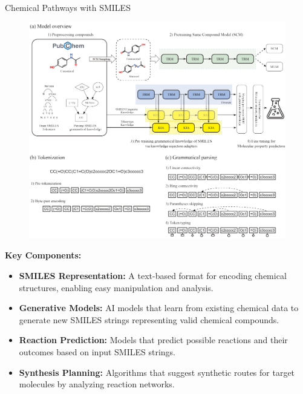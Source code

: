 \begin{frame}[allowframebreaks]{Chemical Pathways with SMILES}
    \framebreak

    \begin{figure}
        \centering
        \includegraphics[height=0.9\textheight,width=1\textwidth,keepaspectratio]{images/science/smile-architecture.png}
    \end{figure}

    \framebreak
    \textbf{Key Components:}
    \begin{itemize}
        \item \textbf{SMILES Representation:} A text-based format for encoding chemical structures, enabling easy manipulation and analysis.
        \item \textbf{Generative Models:} AI models that learn from existing chemical data to generate new SMILES strings representing valid chemical compounds.
        \item \textbf{Reaction Prediction:} Models that predict possible reactions and their outcomes based on input SMILES strings.
        \item \textbf{Synthesis Planning:} Algorithms that suggest synthetic routes for target molecules by analyzing reaction networks.
    \end{itemize}

    \framebreak


\end{frame}
